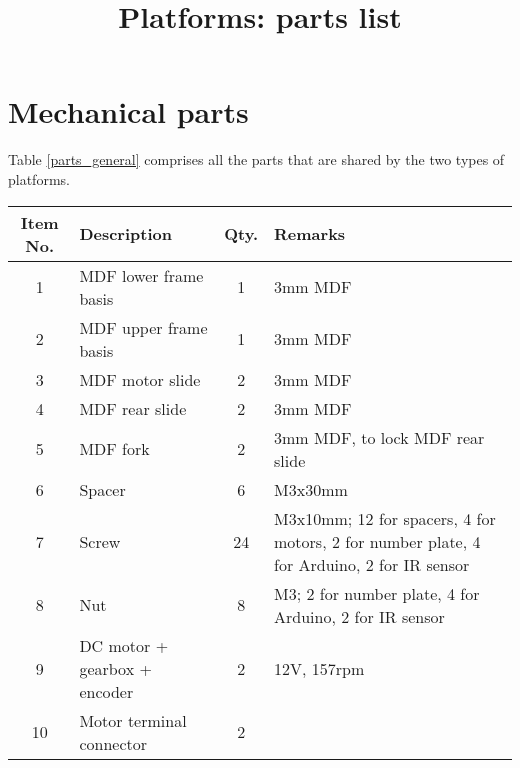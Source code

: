 \documentclass[10pt,a4paper]{article}
\title{\textbf{Platforms: parts list}}
\date{\vspace{-5ex}}
\begin{document}
\maketitle
\vspace*{-3em}
\section{Mechanical parts}
Table \ref{parts_general} comprises all the parts that are shared by the two types of platforms.
\begin{table}[h]
 \centering
 \begin{tabular}{| c | l | c | l|}
  \hline
  Item No. & Description                  & Qty. & Remarks                                                              \\ \hline
  1        & MDF lower frame basis        & 1    & \footnotesize 3mm MDF                                                \\ \hline
  2        & MDF upper frame basis        & 1    & \footnotesize 3mm MDF                                                \\ \hline
  3        & MDF motor slide              & 2    & \footnotesize 3mm MDF                                                \\ \hline
  4        & MDF rear slide               & 2    & \footnotesize 3mm MDF                                                \\ \hline
  5        & MDF fork                     & 2    & \footnotesize 3mm MDF, to lock MDF rear slide                        \\ \hline
  6        & Spacer                       & 6    & \footnotesize M3x30mm                                                \\ \hline
  7        & Screw                        & 24   & \begin{minipage}{6cm}
   \footnotesize M3x10mm; 12 for spacers, 4 for motors, 2 for number plate, 4 for Arduino, 2 for IR sensor
  \end{minipage}                                            \\ \hline
  8        & Nut                          & 8    & \footnotesize M3; 2 for number plate, 4 for Arduino, 2 for IR sensor \\ \hline
  9        & DC motor + gearbox + encoder & 2    & \footnotesize 12V, 157rpm                                            \\ \hline
  10       & Motor terminal connector     & 2    &                                                                      \\ \hline

\end{tabular}
\end{table}
\end{document}
